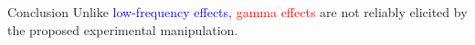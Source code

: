 \documentclass[final]{beamer}
\begin{document}
\begin{frame}{}
\begin{textblock}{69}
\begin{block}{Conclusion}
Unlike \textcolor{blue}{low-frequency effects}, \textcolor{red}{gamma effects} are not reliably elicited by the proposed experimental manipulation.
\end{block}
\end{textblock}


\end{frame}
\end{document}
